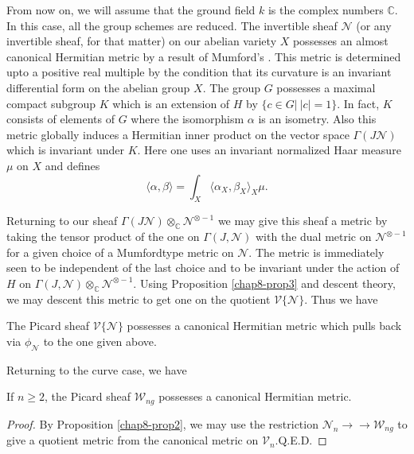 From now on, we will assume that the ground field $k$ is the complex
numbers $\mathbb{C}$. In this case, all the group schemes are
reduced. The invertible sheaf $\mathscr{N}$ (or any invertible sheaf,
for that matter) on our abelian variety $X$ possesses an almost
canonical Hermitian metric by a result of
Mumford's \cite{chap8-key6}. This metric is determined upto a positive
real multiple by the condition that its curvature is an invariant
differential form on the abelian group $X$. The group $G$ possesses a
maximal compact subgroup $K$ which is an extension of $H$ by $\{c\in
G|~|c|=1\}$. In fact, $K$ consists of elements of $G$ where the
isomorphism $\alpha$ is an isometry. Also this metric globally induces
a Hermitian inner product on the vector space $\Gamma(J\mathscr{N})$
which is invariant under $K$. Here one uses an invariant normalized
Haar measure $\mu$ on $X$ and defines
$$
\langle \alpha,\beta\rangle
=\int_{X}\langle \alpha_{X},\beta_{X}\rangle_{X}\mu. 
$$

Returning to our sheaf
$\Gamma(J\mathscr{N})\otimes_{\mathbb{C}}\mathscr{N}^{\otimes -1}$ we
may give this sheaf a metric by taking the tensor product of the one
on $\Gamma(J,\mathscr{N})$ with the dual metric on $\mathscr{N}^{\otimes-1}$
for a given choice of a Mumford\pageoriginale type metric on
$\mathscr{N}$. The metric is immediately seen to be independent of the
last choice and to be invariant under the action of $H$ on
$\Gamma(J,\mathscr{N})\otimes_{\mathbb{C}}\mathscr{N}^{\otimes
-1}$. Using Proposition \ref{chap8-prop3} and descent theory, we may
descent this metric to get one on the quotient
$\mathscr{V}\{\mathscr{N}\}$. Thus we have

\begin{proposition}\label{chap8-prop4}
The Picard sheaf $\mathscr{V}\{\mathscr{N}\}$ possesses a canonical
Hermitian metric which pulls back via $\phi_{\mathscr{N}}$ to the one
given above.
\end{proposition}

Returning to the curve case, we have

\begin{coro*}
If $n\geq 2$, the Picard sheaf $\mathscr{W}_{ng}$ possesses a
canonical Hermitian metric.
\end{coro*}

\begin{proof}
By Proposition \ref{chap8-prop2}, we may use the restriction
$\mathscr{N}_{n}\to\to \mathscr{W}_{ng}$ to give a quotient metric
from the canonical metric on $\mathscr{V}_{n}$.\hfill Q.E.D.
\end{proof}

